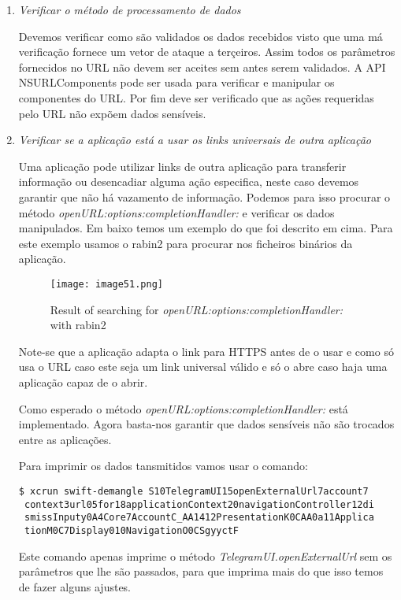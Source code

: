 \begin{enumerate}
\item \textit{Verificar o método de processamento de dados}\par
\hfill\par

	Devemos verificar como são validados os dados recebidos visto que uma má verificação fornece um vetor de ataque a terçeiros. Assim todos os parâmetros fornecidos no URL não devem ser aceites sem antes serem validados.  
	A API NSURLComponents pode ser usada para verificar e manipular os componentes do URL.
	Por fim deve ser verificado que as ações requeridas pelo URL não expõem dados sensíveis.\par
\hfill\par


\item \textit{Verificar se a aplicação está a usar os links universais de outra aplicação}\par
\hfill\par

	Uma aplicação pode utilizar links de outra aplicação para transferir informação ou desencadiar alguma ação especifica, neste caso devemos garantir que não há vazamento de informação.
	Podemos para isso procurar o método \textit{openURL:options:completionHandler:} e verificar os dados manipulados.
	Em baixo temos um exemplo do que foi descrito em cima. Para este exemplo usamos o rabin2 para procurar nos ficheiros binários da aplicação.\par

\begin{figure}[H]
\centering
\texttt{[image: image51.png]}
\caption {Result of searching for \textit{openURL:options:completionHandler:} with rabin2}
\label {fig02}
\end{figure}

	Note-se que a aplicação adapta o link para HTTPS antes de o usar e como só usa o URL caso este seja um link universal válido e só o abre caso haja uma aplicação capaz de o abrir.\par

	Como esperado o método \textit{openURL:options:completionHandler:} está implementado. Agora basta-nos garantir que dados sensíveis não são trocados entre as aplicações.\par

	Para imprimir os dados tansmitidos vamos usar o comando:
	\begin{lstlisting}[basicstyle=\small,]
 $ xcrun swift-demangle S10TelegramUI15openExternalUrl7account7
 context3url05for18applicationContext20navigationController12di
 smissInputy0A4Core7AccountC_AA1412PresentationK0CAA0a11Applica
 tionM0C7Display010NavigationO0CSgyyctF
	 \end{lstlisting}
	 Este comando apenas imprime o método \textit{TelegramUI.openExternalUrl} sem os parâmetros que lhe são passados, para que imprima mais do que isso temos de fazer alguns ajustes.\par
\hfill\par


\end{enumerate}
